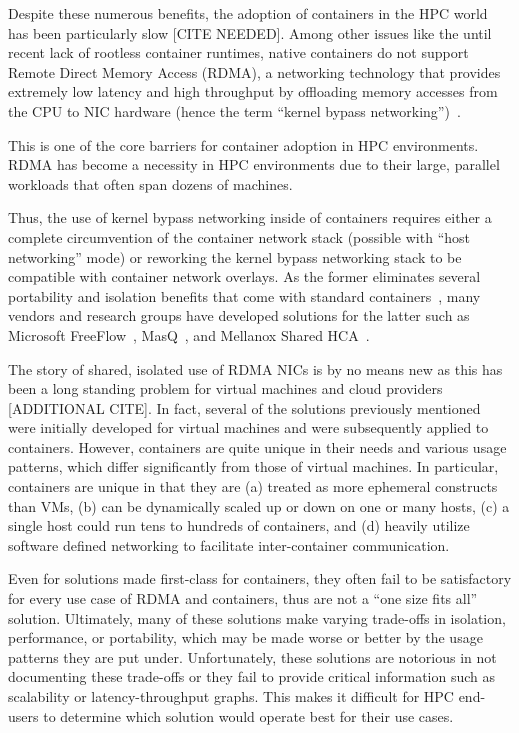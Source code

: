 \documentclass[12pt,titlepage]{article}
\begin{document}
Despite these numerous benefits, the adoption of containers in the HPC world has been particularly slow [CITE NEEDED].
Among other issues like the until recent lack of rootless container runtimes, native containers do not support Remote Direct Memory Access (RDMA), a networking technology that provides extremely low latency and high throughput by offloading memory accesses from the CPU to NIC hardware (hence the term ``kernel bypass networking'')~\cite{mellanoxrocerdmabenefits}.

This is one of the core barriers for container adoption in HPC environments.
RDMA has become a necessity in HPC environments due to their large, parallel workloads that often span dozens of machines.

Thus, the use of kernel bypass networking inside of containers requires either a complete circumvention of the container network stack (possible with ``host networking'' mode) or reworking the kernel bypass networking stack to be compatible with container network overlays.
As the former eliminates several portability and isolation benefits that come with standard containers~\cite{kim2019freeflow}, many vendors and research groups have developed solutions for the latter such as Microsoft FreeFlow~\cite{kim2019freeflow}, MasQ~\cite{he2020masq}, and Mellanox Shared HCA~\cite{mellanoxdockerroce}.

The story of shared, isolated use of RDMA NICs is by no means new as this has been a long standing problem for virtual machines and cloud providers~\cite{he2020masq} [ADDITIONAL CITE].
In fact, several of the solutions previously mentioned were initially developed for virtual machines and were subsequently applied to containers.
However, containers are quite unique in their needs and various usage patterns, which differ significantly from those of virtual machines.
In particular, containers are unique in that they are (a) treated as more ephemeral constructs than VMs, (b) can be dynamically scaled up or down on one or many hosts, (c) a single host could run tens to hundreds of containers, and (d) heavily utilize software defined networking to facilitate inter-container communication.


Even for solutions made first-class for containers, they often fail to be satisfactory for every use case of RDMA and containers, thus are not a ``one size fits all'' solution.
Ultimately, many of these solutions make varying trade-offs in isolation, performance, or portability, which may be made worse or better by the usage patterns they are put under.
Unfortunately, these solutions are notorious in not documenting these trade-offs or they fail to provide critical information such as scalability or latency-throughput graphs.
This makes it difficult for HPC end-users to determine which solution would operate best for their use cases.
\end{document}
